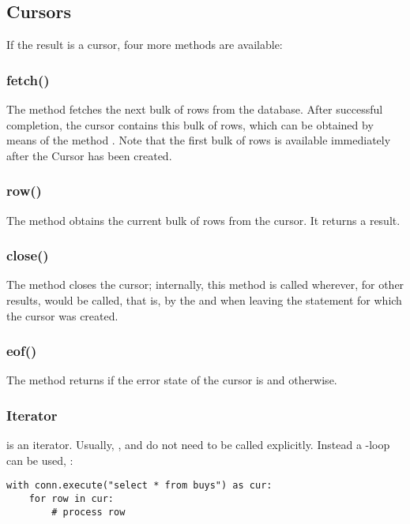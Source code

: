 \subsection{Cursors}
If the result is a cursor,
four more methods are available:

\subsubsection{fetch()}
The method fetches the next bulk
of rows from the database.
After successful completion,
the cursor contains this bulk
of rows, which can be obtained by means of
the method .
Note that the first bulk of rows
is available immediately after
the Cursor has been created.

\subsubsection{row()}
The method obtains the current
bulk of rows from the cursor.
It returns a  result.

\subsubsection{close()}
The method closes the cursor;
internally, this method is called
wherever, for other results, 
would be called, that is, by the 
and when leaving the  statement
for which the cursor was created.

\subsubsection{eof()}
The method returns 
if the error state of the cursor
is  and 
otherwise.

\subsubsection{Iterator}
 is an iterator.
Usually, , 
and  do not need to be called
explicitly.
Instead a -loop  can be used, \eg:

\begin{python}
\begin{lstlisting}
with conn.execute("select * from buys") as cur:
    for row in cur:
        # process row 
\end{lstlisting}
\end{python}

